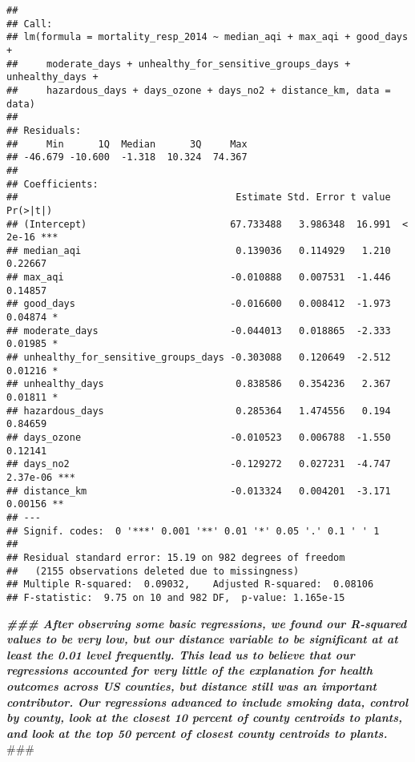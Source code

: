 \documentclass[
]{article}
\newenvironment{Shaded}{\begin{snugshade}}{\end{snugshade}}
\newcommand{\AlertTok}[1]{\textcolor[rgb]{0.94,0.16,0.16}{#1}}
\newcommand{\DocumentationTok}[1]{\textcolor[rgb]{0.56,0.35,0.01}{\textbf{\textit{#1}}}}
\begin{document}
\begin{verbatim}
## 
## Call:
## lm(formula = mortality_resp_2014 ~ median_aqi + max_aqi + good_days + 
##     moderate_days + unhealthy_for_sensitive_groups_days + unhealthy_days + 
##     hazardous_days + days_ozone + days_no2 + distance_km, data = data)
## 
## Residuals:
##     Min      1Q  Median      3Q     Max 
## -46.679 -10.600  -1.318  10.324  74.367 
## 
## Coefficients:
##                                      Estimate Std. Error t value Pr(>|t|)    
## (Intercept)                         67.733488   3.986348  16.991  < 2e-16 ***
## median_aqi                           0.139036   0.114929   1.210  0.22667    
## max_aqi                             -0.010888   0.007531  -1.446  0.14857    
## good_days                           -0.016600   0.008412  -1.973  0.04874 *  
## moderate_days                       -0.044013   0.018865  -2.333  0.01985 *  
## unhealthy_for_sensitive_groups_days -0.303088   0.120649  -2.512  0.01216 *  
## unhealthy_days                       0.838586   0.354236   2.367  0.01811 *  
## hazardous_days                       0.285364   1.474556   0.194  0.84659    
## days_ozone                          -0.010523   0.006788  -1.550  0.12141    
## days_no2                            -0.129272   0.027231  -4.747 2.37e-06 ***
## distance_km                         -0.013324   0.004201  -3.171  0.00156 ** 
## ---
## Signif. codes:  0 '***' 0.001 '**' 0.01 '*' 0.05 '.' 0.1 ' ' 1
## 
## Residual standard error: 15.19 on 982 degrees of freedom
##   (2155 observations deleted due to missingness)
## Multiple R-squared:  0.09032,    Adjusted R-squared:  0.08106 
## F-statistic:  9.75 on 10 and 982 DF,  p-value: 1.165e-15
\end{verbatim}

\begin{Shaded}
\begin{Highlighting}[]
\DocumentationTok{\#\#\# After observing some basic regressions, we found our R{-}squared values to be very low, but our distance variable to be significant at at least the 0.01 level frequently. This lead us to believe that our regressions accounted for very little of the explanation for health outcomes across US counties, but distance still was an important contributor. Our regressions advanced to include smoking data, control by county, look at the closest 10 percent of county centroids to plants, and look at the top 50 percent of closest county centroids to plants. }\AlertTok{\#\#\#}
\end{Highlighting}
\end{Shaded}
\end{document}
